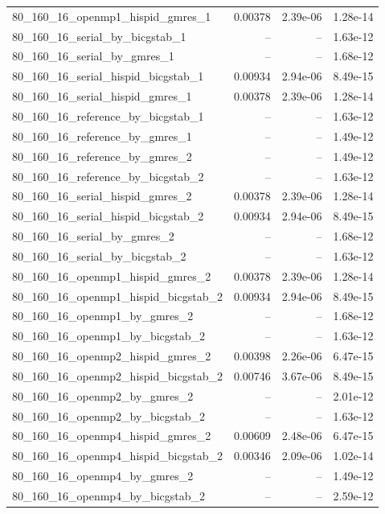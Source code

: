 \documentclass[11pt]{article}
\begin{document}
\begin{longtable}{lrrr}
80\_160\_16\_openmp1\_hispid\_gmres\_1 & 0.00378 & 2.39e-06 & 1.28e-14\\
80\_160\_16\_serial\_by\_bicgstab\_1 & -- & -- & 1.63e-12\\
80\_160\_16\_serial\_by\_gmres\_1 & -- & -- & 1.68e-12\\
80\_160\_16\_serial\_hispid\_bicgstab\_1 & 0.00934 & 2.94e-06 & 8.49e-15\\
80\_160\_16\_serial\_hispid\_gmres\_1 & 0.00378 & 2.39e-06 & 1.28e-14\\
80\_160\_16\_reference\_by\_bicgstab\_1 & -- & -- & 1.63e-12\\
80\_160\_16\_reference\_by\_gmres\_1 & -- & -- & 1.49e-12\\
80\_160\_16\_reference\_by\_gmres\_2 & -- & -- & 1.49e-12\\
80\_160\_16\_reference\_by\_bicgstab\_2 & -- & -- & 1.63e-12\\
80\_160\_16\_serial\_hispid\_gmres\_2 & 0.00378 & 2.39e-06 & 1.28e-14\\
80\_160\_16\_serial\_hispid\_bicgstab\_2 & 0.00934 & 2.94e-06 & 8.49e-15\\
80\_160\_16\_serial\_by\_gmres\_2 & -- & -- & 1.68e-12\\
80\_160\_16\_serial\_by\_bicgstab\_2 & -- & -- & 1.63e-12\\
80\_160\_16\_openmp1\_hispid\_gmres\_2 & 0.00378 & 2.39e-06 & 1.28e-14\\
80\_160\_16\_openmp1\_hispid\_bicgstab\_2 & 0.00934 & 2.94e-06 & 8.49e-15\\
80\_160\_16\_openmp1\_by\_gmres\_2 & -- & -- & 1.68e-12\\
80\_160\_16\_openmp1\_by\_bicgstab\_2 & -- & -- & 1.63e-12\\
80\_160\_16\_openmp2\_hispid\_gmres\_2 & 0.00398 & 2.26e-06 & 6.47e-15\\
80\_160\_16\_openmp2\_hispid\_bicgstab\_2 & 0.00746 & 3.67e-06 & 8.49e-15\\
80\_160\_16\_openmp2\_by\_gmres\_2 & -- & -- & 2.01e-12\\
80\_160\_16\_openmp2\_by\_bicgstab\_2 & -- & -- & 1.63e-12\\
80\_160\_16\_openmp4\_hispid\_gmres\_2 & 0.00609 & 2.48e-06 & 6.47e-15\\
80\_160\_16\_openmp4\_hispid\_bicgstab\_2 & 0.00346 & 2.09e-06 & 1.02e-14\\
80\_160\_16\_openmp4\_by\_gmres\_2 & -- & -- & 1.49e-12\\
80\_160\_16\_openmp4\_by\_bicgstab\_2 & -- & -- & 2.59e-12\\

\end{longtable}
\end{document}

